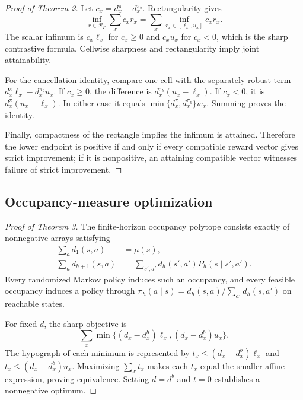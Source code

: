 \documentclass[letterpaper]{article}
\newcommand{\cR}{\mathcal{R}}
\begin{document}
\begin{proof}[Proof of Theorem 2]
Let $c_x=d_x^\pi-d_x^{\pi_b}$. Rectangularity gives
\[
\inf_{r\in\cR_\Gamma}\sum_xc_xr_x
=\sum_x\inf_{r_x\in[\ell_x,u_x]}c_xr_x.
\]
The scalar infimum is $c_x\ell_x$ for $c_x\geq0$ and $c_xu_x$ for $c_x<0$, which is the sharp contrastive formula. Cellwise sharpness and rectangularity imply joint attainability.

For the cancellation identity, compare one cell with the separately robust term
$d_x^\pi\ell_x-d_x^{\pi_b}u_x$. If $c_x\geq0$, the difference is
$d_x^{\pi_b}(u_x-\ell_x)$. If $c_x<0$, it is
$d_x^\pi(u_x-\ell_x)$. In either case it equals
$\min\{d_x^\pi,d_x^{\pi_b}\}w_x$. Summing proves the identity.

Finally, compactness of the rectangle implies the infimum is attained. Therefore the lower endpoint is positive if and only if every compatible reward vector gives strict improvement; if it is nonpositive, an attaining compatible vector witnesses failure of strict improvement.
\end{proof}

\subsection{Occupancy-measure optimization}
\begin{proof}[Proof of Theorem 3]
The finite-horizon occupancy polytope consists exactly of nonnegative arrays satisfying
\begin{align*}
\sum_ad_1(s,a)&=\mu(s),\\
\sum_ad_{h+1}(s,a)&=\sum_{s',a'}d_h(s',a')P_h(s\mid s',a').
\end{align*}
Every randomized Markov policy induces such an occupancy, and every feasible occupancy induces a policy through
$\pi_h(a\mid s)=d_h(s,a)/\sum_{a'}d_h(s,a')$ on reachable states.

For fixed $d$, the sharp objective is
\[
\sum_x\min\{(d_x-d_x^b)\ell_x,(d_x-d_x^b)u_x\}.
\]
The hypograph of each minimum is represented by
$t_x\leq(d_x-d_x^b)\ell_x$ and
$t_x\leq(d_x-d_x^b)u_x$. Maximizing $\sum_xt_x$ makes each $t_x$ equal the smaller affine expression, proving equivalence. Setting $d=d^b$ and $t=0$ establishes a nonnegative optimum.
\end{proof}
\end{document}
